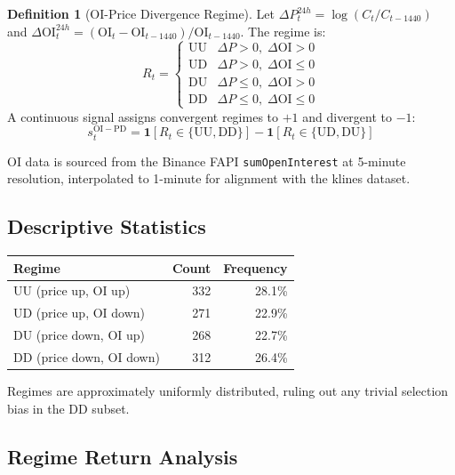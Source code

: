 \documentclass[12pt, a4paper]{article}
\theoremstyle{plain}
\theoremstyle{definition}
\newtheorem{definition}{Definition}[section]
\newcommand{\OI}{\mathrm{OI}}
\begin{document}
\begin{definition}[OI-Price Divergence Regime]
  Let $\Delta P_t^{24h} = \log(C_t / C_{t-1440})$ and
  $\Delta\OI_t^{24h} = (\OI_t - \OI_{t-1440}) / \OI_{t-1440}$.
  The regime is:
  \begin{equation}
    R_t =
    \begin{cases}
      \mathrm{UU} & \Delta P > 0,\; \Delta\OI > 0 \\
      \mathrm{UD} & \Delta P > 0,\; \Delta\OI \leq 0 \\
      \mathrm{DU} & \Delta P \leq 0,\; \Delta\OI > 0 \\
      \mathrm{DD} & \Delta P \leq 0,\; \Delta\OI \leq 0
    \end{cases}
  \end{equation}
  A continuous signal assigns convergent regimes to $+1$ and
  divergent to $-1$:
  \begin{equation}
    s^{\mathrm{OI-PD}}_t = \mathbf{1}[R_t \in \{\mathrm{UU}, \mathrm{DD}\}]
                           - \mathbf{1}[R_t \in \{\mathrm{UD}, \mathrm{DU}\}]
  \end{equation}
\end{definition}

OI data is sourced from the Binance FAPI \texttt{sumOpenInterest}
at 5-minute resolution, interpolated to 1-minute for alignment with
the klines dataset.

\subsection{Descriptive Statistics}

\begin{center}
\begin{tabular}{lrr}
\toprule
Regime & Count & Frequency \\
\midrule
UU (price up, OI up)   & 332 & 28.1\% \\
UD (price up, OI down) & 271 & 22.9\% \\
DU (price down, OI up) & 268 & 22.7\% \\
DD (price down, OI down) & 312 & 26.4\% \\
\bottomrule
\end{tabular}
\end{center}

Regimes are approximately uniformly distributed, ruling out any
trivial selection bias in the DD subset.

\subsection{Regime Return Analysis}
\end{document}
